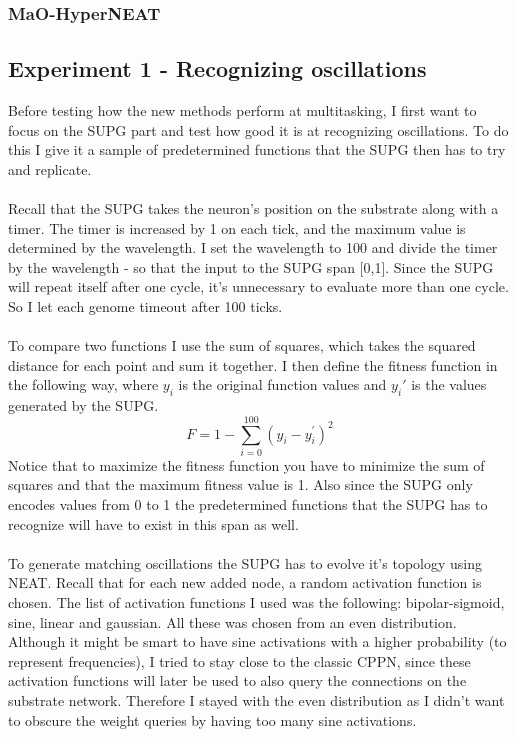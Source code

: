 \documentclass[11pt, a4paper]{article}
\begin{document}
\subsubsection{MaO-HyperNEAT}
\subsection{Experiment 1 - Recognizing oscillations}
Before testing how the new methods perform at  multitasking, I first want to focus on the SUPG part and test how good it is at recognizing oscillations. To do this I give it a sample of predetermined functions that the SUPG then has to try and replicate.
\\
\\
Recall that the SUPG takes the neuron's position on the substrate along with a timer. The timer is increased by 1 on each tick, and the maximum value is determined by the wavelength. I set the wavelength to 100 and divide the timer by the wavelength - so that the input to the SUPG span [0,1]. Since the SUPG will repeat itself after one cycle, it's unnecessary to evaluate more than one cycle. So I let each genome timeout after 100 ticks.
\\
\\
To compare two functions I use the sum of squares, which takes the squared distance for each point and sum it together. I then define the fitness function in the following way, where $ y_i $ is the original function values and $ y_i' $ is the values generated by the SUPG.
\begin{equation} F = 1 - \sum_{i=0}^{100}(y_i-y_i^{'})^2 \end{equation}
Notice that to maximize the fitness function you have to minimize the sum of squares and that the maximum fitness value is 1. Also since the SUPG only encodes values from 0 to 1 the predetermined functions that the SUPG has to recognize will have to exist in this span as well.
\\
\\
To generate matching oscillations the SUPG has to evolve it's topology using NEAT. Recall that for each new added node, a random activation function is chosen. The list of activation functions I used was the following: bipolar-sigmoid, sine, linear and gaussian. All these was chosen from an even distribution. Although it might be smart to have sine activations with a higher probability (to represent frequencies), I tried to stay close to the classic CPPN, since these activation functions will later be used to also query the connections on the substrate network. Therefore I stayed with the even distribution as I didn't want to obscure the weight queries by having too many sine activations.
\end{document}

